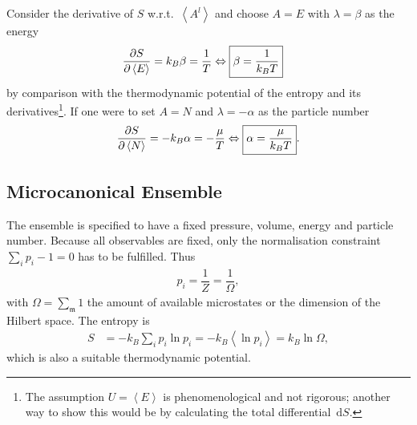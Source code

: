 \documentclass[a4paper,10pt]{article}
\newcommand{\td}{\,\text{d}}
\numberwithin{equation}{section}
\begin{document}
\begin{multicols}{2}
Consider the derivative of $S$ w.r.t.\ $\left\langle A^l\right\rangle $ and choose $A=E$ with $\lambda =\beta $ as the energy
\begin{align} 
  \diffp[]{S}{\left\langle E\right\rangle } &= k_B\beta =\dfrac{1}{T}\Leftrightarrow \boxed{\beta =\dfrac{1}{k_BT}}
\end{align} 
by comparison with the thermodynamic potential of the entropy and its derivatives\footnote{The assumption $U=\left\langle E\right\rangle $ is phenomenological and not rigorous; another way to show this would be by calculating the total differential $\td S$.}.
If one were to set $A=N$ and $\lambda =-\alpha $ as the particle number
\begin{align} 
  \diffp[]{S}{\left\langle N\right\rangle }=-k_B\alpha =-\dfrac{\mu }{T}\Leftrightarrow \boxed{\alpha =\dfrac{\mu }{k_BT}}
.\end{align} 


\subsection{Microcanonical Ensemble}
The ensemble is specified to have a fixed pressure, volume, energy and particle number.
Because all observables are fixed, only the normalisation constraint $\sum_{i}^{}p_i-1=0$ has to be fulfilled.
Thus
\begin{align} 
  p_i=\dfrac{1}{Z}=\dfrac{1}{\Omega }
,\end{align} 
with $\Omega =\sum_{\mathfrak{m}}^{}1$ the amount of available microstates or the dimension of the Hilbert space.
The entropy is
\begin{align} 
  S &= -k_B\sum_{i}^{}p_i\ln p_i=-k_B\left\langle \ln p_i\right\rangle =k_B\ln \Omega 
,\end{align} 
which is also a suitable thermodynamic potential.


\end{multicols}
\end{document}
